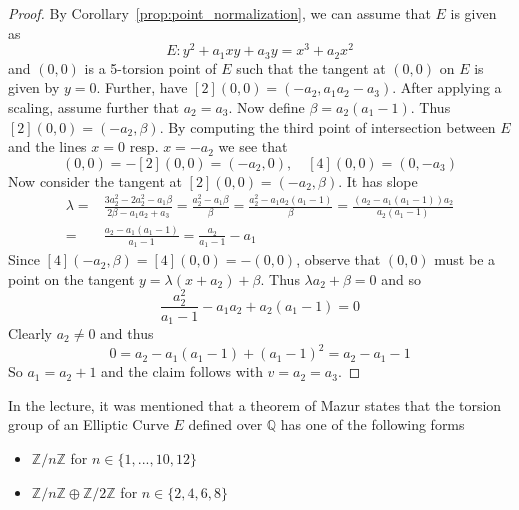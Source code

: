 \documentclass{scrartcl}
\newcommand{\Z}{\mathbb{Z}}
\newcommand{\Q}{\mathbb{Q}}
\theoremstyle{definition}
\begin{document}
\begin{proof}
    By Corollary~\ref{prop:point_normalization}, we can assume that $E$ is given as
    \begin{equation*}
        E: y^2 + a_1 x y + a_3 y = x^3 + a_2 x^2
    \end{equation*}
    and $(0, 0)$ is a 5-torsion point of $E$ such that the tangent at $(0, 0)$ on $E$ is given by $y = 0$.
    Further, have $[2](0, 0) = (-a_2, a_1 a_2 - a_3)$.
    After applying a scaling, assume further that $a_2 = a_3$.
    Now define $\beta = a_2(a_1 - 1)$.
    Thus $[2](0, 0) = (-a_2, \beta)$.
    By computing the third point of intersection between $E$ and the lines $x = 0$ resp. $x = -a_2$ we see that 
    \begin{equation*}
        [3](0, 0) = -[2](0, 0) = (-a_2, 0), \quad [4](0, 0) = (0, -a_3)
    \end{equation*}
    Now consider the tangent at $[2](0, 0) = (-a_2, \beta)$.
    It has slope
    \begin{align*}
        \lambda =& \frac {3 a_2^2 - 2 a_2^2 - a_1 \beta} {2\beta - a_1 a_2 + a_3} = \frac {a_2^2 - a_1\beta} \beta = \frac {a_2^2 - a_1a_2(a_1 - 1)} \beta = \frac {(a_2 - a_1(a_1 - 1))a_2} {a_2(a_1 - 1)} \\
        =& \frac {a_2 - a_1(a_1 - 1)} {a_1 - 1} = \frac {a_2} {a_1 - 1} - a_1
    \end{align*}
    Since $[4](-a_2, \beta) = [4](0, 0) = -(0, 0)$, observe that $(0, 0)$ must be a point on the tangent $y = \lambda (x + a_2) + \beta$.
    Thus $\lambda a_2 + \beta = 0$ and so
    \begin{equation*}
        \frac {a_2^2} {a_1 - 1} - a_1 a_2 + a_2(a_1 - 1) = 0
    \end{equation*}
    Clearly $a_2 \neq 0$ and thus
    \begin{equation*}
        0 = a_2 - a_1 (a_1 - 1) + (a_1 - 1)^2 = a_2 - a_1 - 1
    \end{equation*}
    So $a_1 = a_2 + 1$ and the claim follows with $v = a_2 = a_3$.
\end{proof}
In the lecture, it was mentioned that a theorem of Mazur states that the torsion group of an Elliptic Curve $E$ defined over $\Q$ has one of the following forms
\begin{itemize}
    \item $\Z/n\Z$ for $n \in \{ 1, ..., 10, 12 \}$
    \item $\Z/n\Z \oplus \Z/2\Z$ for $n \in \{ 2, 4, 6, 8 \}$
\end{itemize}
\end{document}
